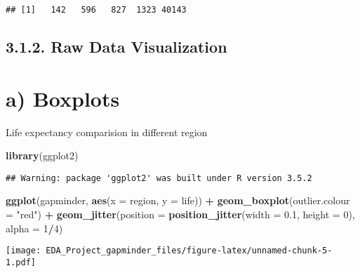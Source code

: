 \documentclass[]{article}
\newenvironment{Shaded}{\begin{snugshade}}{\end{snugshade}}
\newcommand{\KeywordTok}[1]{\textcolor[rgb]{0.13,0.29,0.53}{\textbf{#1}}}
\newcommand{\DataTypeTok}[1]{\textcolor[rgb]{0.13,0.29,0.53}{#1}}
\newcommand{\DecValTok}[1]{\textcolor[rgb]{0.00,0.00,0.81}{#1}}
\newcommand{\FloatTok}[1]{\textcolor[rgb]{0.00,0.00,0.81}{#1}}
\newcommand{\StringTok}[1]{\textcolor[rgb]{0.31,0.60,0.02}{#1}}
\newcommand{\OperatorTok}[1]{\textcolor[rgb]{0.81,0.36,0.00}{\textbf{#1}}}
\newcommand{\NormalTok}[1]{#1}
\begin{document}
\begin{Shaded}
\end{Shaded}

\begin{verbatim}
## [1]   142   596   827  1323 40143
\end{verbatim}

\subsection{3.1.2. Raw Data Visualization}\label{raw-data-visualization}

\section{a) Boxplots}\label{a-boxplots}

Life expectancy comparision in different region

\begin{Shaded}
\begin{Highlighting}[]
\KeywordTok{library}\NormalTok{(ggplot2)}
\end{Highlighting}
\end{Shaded}

\begin{verbatim}
## Warning: package 'ggplot2' was built under R version 3.5.2
\end{verbatim}

\begin{Shaded}
\begin{Highlighting}[]
\KeywordTok{ggplot}\NormalTok{(gapminder, }\KeywordTok{aes}\NormalTok{(}\DataTypeTok{x =}\NormalTok{ region, }\DataTypeTok{y =}\NormalTok{ life)) }\OperatorTok{+}\StringTok{  }\KeywordTok{geom_boxplot}\NormalTok{(}\DataTypeTok{outlier.colour =} \StringTok{"red"}\NormalTok{) }\OperatorTok{+}\StringTok{  }\KeywordTok{geom_jitter}\NormalTok{(}\DataTypeTok{position =} \KeywordTok{position_jitter}\NormalTok{(}\DataTypeTok{width =} \FloatTok{0.1}\NormalTok{, }\DataTypeTok{height =} \DecValTok{0}\NormalTok{), }\DataTypeTok{alpha =} \DecValTok{1}\OperatorTok{/}\DecValTok{4}\NormalTok{)}
\end{Highlighting}
\end{Shaded}

\texttt{[image: EDA\_Project\_gapminder\_files/figure-latex/unnamed-chunk-5-1.pdf]}
\end{document}

